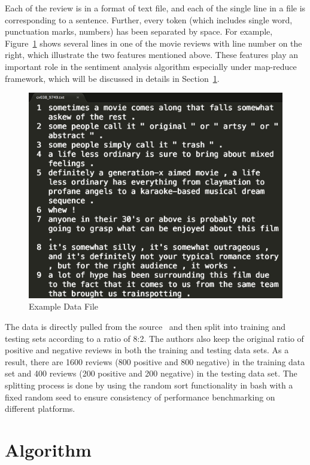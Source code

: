 Each of the review is in a format of text file, and each of the single line in a 
file is corresponding to a sentence. Further, every token (which includes 
single word, punctuation marks, numbers) has been separated by space. For 
example, Figure~\ref{f:data} shows several lines in one of the movie reviews 
with line number on the right, which illustrate the two features mentioned 
above. These features play an important role in the sentiment analysis 
algorithm especially under map-reduce framework, which will be discussed in 
details in Section~\ref{s:algorithm}.
\begin{figure}[!ht]
	\centering\includegraphics[width=\columnwidth]{images/polarity-data.png}
	\caption{Example Data File}
	\label{f:data}
\end{figure}

The data is directly pulled from the 
source~\cite{hid-sp18-405-sentiment-data} and then split into training and 
testing sets according to a ratio of 8:2. The authors also keep the original 
ratio of positive and negative reviews in both the training and testing data 
sets. As a result, there are 1600 reviews (800 positive and 800 negative) in 
the training data set and 400 reviews (200 positive and 200 negative) in the 
testing data set. The splitting process is done by using the random sort 
functionality in bash with a fixed random seed to ensure consistency of 
performance benchmarking on different platforms. 


\section{Algorithm}
\label{s:algorithm}

